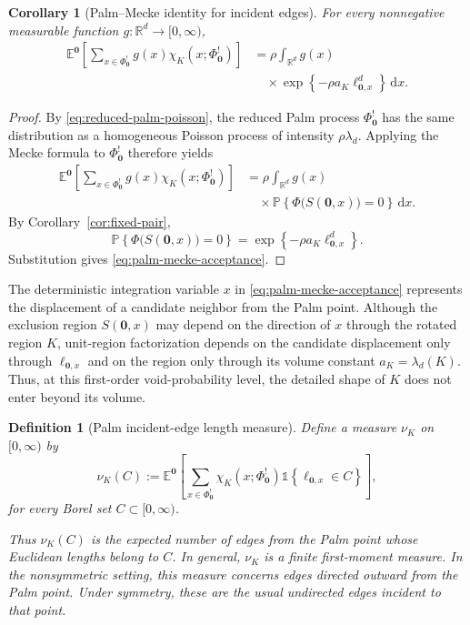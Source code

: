 \documentclass[a4paper,fleqn]{cas-dc}
\numberwithin{equation}{section}
\newcommand{\R}{\mathds{R}}
\newcommand{\Pp}{\mathds{P}}
\newcommand{\E}{\mathds{E}}
\newcommand{\1}{\mathds{1}}
\newcommand{\dd}{\mathrm{d}}
\newcommand{\ellox}{\ell_{\mathbf{0},x}}
\newcommand{\0}{\mathbf{0}}
\newtheorem{corollary}[theorem]{Corollary}
\newtheorem{definition}[theorem]{Definition}
\begin{document}
\begin{corollary}[Palm--Mecke identity for incident edges]
\label{cor:palm-mecke}
For every nonnegative measurable function
\(g\colon\R^d\to[0,\infty)\),
\begin{equation}\label{eq:palm-mecke-acceptance}
\begin{aligned}
\E^{\0}\left[
\sum_{x\in\Phi_\0^!} g(x)\chi_K(x;\Phi_\0^!)
\right]
&=\rho\int_{\R^d}g(x)\\
&\quad{}\times\exp\left\{-\rho a_K\ellox^{d}\right\}\,\dd x.
\end{aligned}
\end{equation}
\end{corollary}

\begin{proof}
By \eqref{eq:reduced-palm-poisson}, the reduced Palm process
\(\Phi_\0^!\) has the same distribution as a homogeneous Poisson process of
intensity \(\rho\lambda_d\). Applying the Mecke formula to \(\Phi_\0^!\)
therefore yields
\begin{equation}
\begin{aligned}
\E^{\0}\left[
\sum_{x\in\Phi_\0^!} g(x)\chi_K(x;\Phi_\0^!)
\right]
&=\rho\int_{\R^d}g(x)\\
&\quad{}\times\Pp\left\{\Phi\bigl(S(\0,x)\bigr)=0\right\}\,\dd x.
\end{aligned}
\end{equation}
By Corollary~\ref{cor:fixed-pair},
\begin{equation}
\Pp\left\{
\Phi\bigl(S(\0,x)\bigr)=0
\right\}
=
\exp\left\{-\rho a_K\ellox^{d}\right\}.
\end{equation}
Substitution gives \eqref{eq:palm-mecke-acceptance}.
\end{proof}

The deterministic integration variable $x$ in \eqref{eq:palm-mecke-acceptance} represents the displacement of a candidate neighbor from the Palm point. Although the exclusion region $S(\0,x)$ may depend on the direction of $x$ through the rotated region $K$, unit-region factorization depends on the candidate displacement only through $\ellox$ and on the region only through its volume constant $a_K = \lambda_d(K)$. Thus, at this first-order void-probability level, the detailed shape of $K$ does not enter beyond its volume.


\begin{definition}[Palm incident-edge length measure]
\label{def:palm-length-measure}
Define a measure \(\nu_K\) on \([0,\infty)\) by
\begin{equation}\label{eq:palm-length-measure-eq}
\nu_K(C)
:=
\E^{\0}\left[
\sum_{x\in\Phi_\0^!}
\chi_K(x;\Phi_{\0}^!)
\1\left\{\ellox\in C\right\}
\right],
\end{equation}
for every Borel set \(C\subset[0,\infty)\).

Thus \(\nu_K(C)\) is the expected number of edges from the Palm point whose Euclidean lengths belong to \(C\). In general, \(\nu_K\) is a finite
first-moment measure.
In the nonsymmetric setting, this measure concerns edges directed
outward from the Palm point. Under symmetry, these are the usual
undirected edges incident to that point.
\end{definition}
\end{document}
